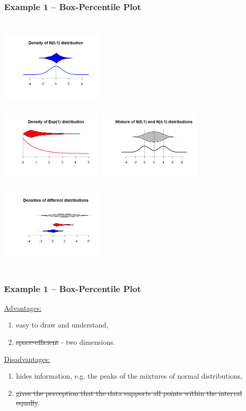 \documentclass[11pt,usenames,dvipsnames,svgnames,x11names]{beamer}
\theoremstyle{plain}
\theoremstyle{definition}
\theoremstyle{remark}
\begin{document}
\begin{frame}
	\frametitle{Example 1 -- Box-Percentile Plot}
	\begin{columns}[t]
			\centering
			\includegraphics[width=5cm,height=4cm]{1111.png}\\
			\includegraphics[width=5cm,height=4cm]{2222.png}
		\centering
		\includegraphics[width=5cm,height=4cm]{3333.png}\\
		\includegraphics[width=5cm,height=4cm]{4444.png}
	\end{columns}
\end{frame}

\begin{frame}
	\frametitle{Example 1 -- Box-Percentile Plot}
	\underline{Advantages:}	
	\begin{enumerate}
		\item easy to draw and understand,
		\item \sout{space-efficient} - two dimensions.
	\end{enumerate}
	\bigskip
	\underline{Disadvantages:}
	\begin{enumerate}
		\item hides information, e.g. the peaks of the mixtures of normal distributions,
		\item \sout{gives the perception that the data supports all points within the interval equally}.
	\end{enumerate}
\end{frame}
\end{document}
